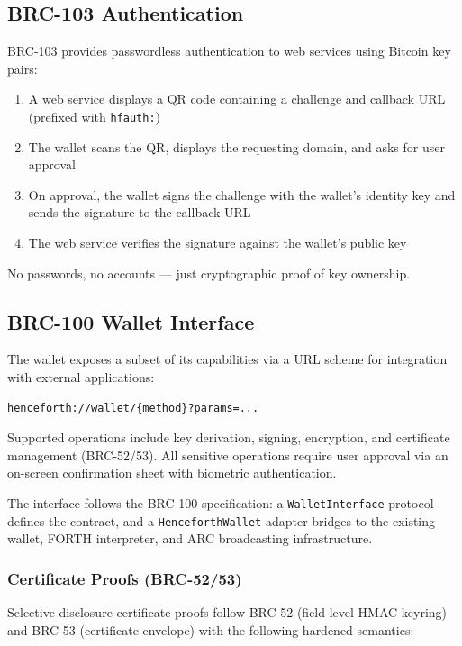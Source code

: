 \documentclass[a4paper, 11pt, openany]{book}
\begin{document}
\subsection{BRC-103 Authentication}

BRC-103 provides passwordless authentication to web services using Bitcoin key pairs:

\begin{enumerate}
\item A web service displays a QR code containing a challenge and callback URL (prefixed with \texttt{hfauth:})
\item The wallet scans the QR, displays the requesting domain, and asks for user approval
\item On approval, the wallet signs the challenge with the wallet's identity key and sends the signature to the callback URL
\item The web service verifies the signature against the wallet's public key
\end{enumerate}

No passwords, no accounts --- just cryptographic proof of key ownership.

\subsection{BRC-100 Wallet Interface}

The wallet exposes a subset of its capabilities via a URL scheme for integration with external applications:

\begin{verbatim}
henceforth://wallet/{method}?params=...
\end{verbatim}

Supported operations include key derivation, signing, encryption, and certificate management (BRC-52/53). All sensitive operations require user approval via an on-screen confirmation sheet with biometric authentication.

The interface follows the BRC-100 specification: a \texttt{WalletInterface} protocol defines the contract, and a \texttt{HenceforthWallet} adapter bridges to the existing wallet, FORTH interpreter, and ARC broadcasting infrastructure.

\subsubsection{Certificate Proofs (BRC-52/53)}

Selective-disclosure certificate proofs follow BRC-52 (field-level HMAC keyring) and BRC-53 (certificate envelope) with the following hardened semantics:
\end{document}
